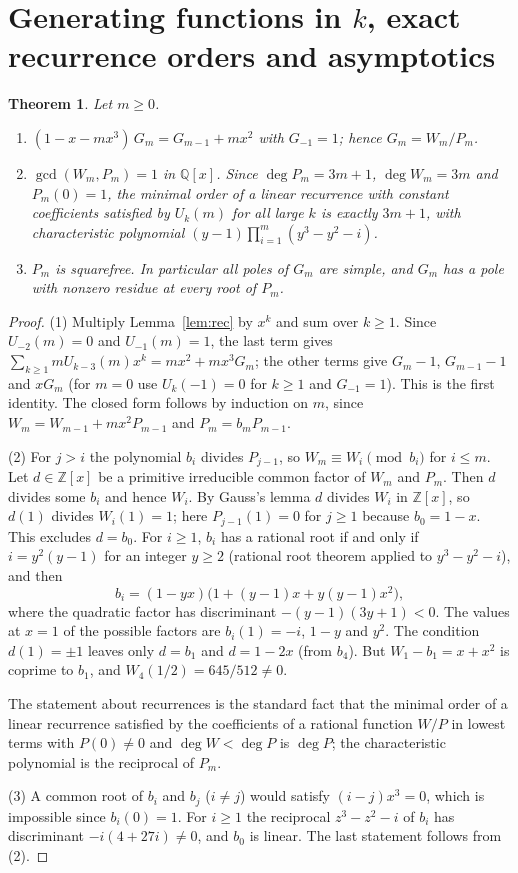 \documentclass[11pt]{amsart}
\newtheorem{theorem}{Theorem}[section]
\theoremstyle{definition}
\newcommand{\Q}{\mathbb{Q}}
\newcommand{\Z}{\mathbb{Z}}
\begin{document}
\section{Generating functions in \texorpdfstring{$k$}{k}, exact recurrence orders and asymptotics}\label{sec:gf}

\begin{theorem}\label{thm:gf}
Let $m\ge0$.
\begin{enumerate}
\item $(1-x-mx^3)\,G_m=G_{m-1}+mx^2$ with $G_{-1}=1$; hence $G_m=W_m/P_m$.
\item $\gcd(W_m,P_m)=1$ in $\Q[x]$. Since $\deg P_m=3m+1$, $\deg W_m=3m$ and $P_m(0)=1$, the minimal order of a linear recurrence with constant coefficients satisfied by $U_k(m)$ for all large $k$ is exactly $3m+1$, with characteristic polynomial $(y-1)\prod_{i=1}^{m}(y^3-y^2-i)$.
\item $P_m$ is squarefree. In particular all poles of $G_m$ are simple, and $G_m$ has a pole with nonzero residue at every root of $P_m$.
\end{enumerate}
\end{theorem}

\begin{proof}
(1) Multiply Lemma~\ref{lem:rec} by $x^k$ and sum over $k\ge1$. Since $U_{-2}(m)=0$ and $U_{-1}(m)=1$, the last term gives $\sum_{k\ge1}mU_{k-3}(m)x^k=mx^2+mx^3G_m$; the other terms give $G_m-1$, $G_{m-1}-1$ and $xG_m$ (for $m=0$ use $U_k(-1)=0$ for $k\ge1$ and $G_{-1}=1$). This is the first identity. The closed form follows by induction on $m$, since $W_m=W_{m-1}+mx^2P_{m-1}$ and $P_m=b_mP_{m-1}$.

(2) For $j>i$ the polynomial $b_i$ divides $P_{j-1}$, so $W_m\equiv W_i\pmod{b_i}$ for $i\le m$. Let $d\in\Z[x]$ be a primitive irreducible common factor of $W_m$ and $P_m$. Then $d$ divides some $b_i$ and hence $W_i$. By Gauss's lemma $d$ divides $W_i$ in $\Z[x]$, so $d(1)$ divides $W_i(1)=1$; here $P_{j-1}(1)=0$ for $j\ge1$ because $b_0=1-x$. This excludes $d=b_0$. For $i\ge1$, $b_i$ has a rational root if and only if $i=y^2(y-1)$ for an integer $y\ge2$ (rational root theorem applied to $y^3-y^2-i$), and then
\[
  b_i=(1-yx)\bigl(1+(y-1)x+y(y-1)x^2\bigr),
\]
where the quadratic factor has discriminant $-(y-1)(3y+1)<0$. The values at $x=1$ of the possible factors are $b_i(1)=-i$, $1-y$ and $y^2$. The condition $d(1)=\pm1$ leaves only $d=b_1$ and $d=1-2x$ (from $b_4$). But $W_1-b_1=x+x^2$ is coprime to $b_1$, and $W_4(1/2)=645/512\ne0$.

The statement about recurrences is the standard fact that the minimal order of a linear recurrence satisfied by the coefficients of a rational function $W/P$ in lowest terms with $P(0)\ne0$ and $\deg W<\deg P$ is $\deg P$; the characteristic polynomial is the reciprocal of $P_m$.

(3) A common root of $b_i$ and $b_j$ ($i\ne j$) would satisfy $(i-j)x^3=0$, which is impossible since $b_i(0)=1$. For $i\ge1$ the reciprocal $z^3-z^2-i$ of $b_i$ has discriminant $-i(4+27i)\ne0$, and $b_0$ is linear. The last statement follows from (2).
\end{proof}
\end{document}

